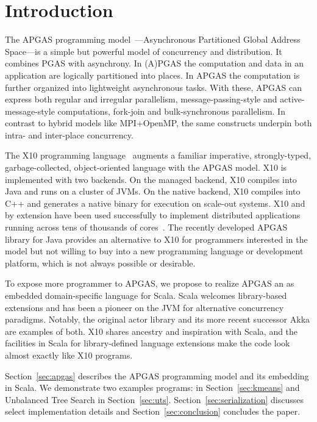 \section{Introduction}

The APGAS programming model~\cite{amp10}---Asynchronous Partitioned Global Address Space---is a simple but powerful
model of concurrency and distribution. It combines PGAS with asynchrony.
In (A)PGAS the computation and data in an application are logically partitioned into places.
In APGAS the computation is further organized into lightweight asynchronous tasks.
With these, APGAS can express both
regular and irregular parallelism, message-passing-style and
active-message-style computations, fork-join and bulk-synchronous
parallelism.  In contrast to hybrid models like MPI+OpenMP, the same
constructs underpin both intra- and inter-place concurrency.

The X10 programming language~\cite{oopsla05} augments a familiar imperative, strongly-typed, garbage-collected, object-oriented language with the APGAS model. X10 is implemented with two backends. On the managed backend, X10
compiles into Java and runs on a cluster of JVMs. On the native backend, X10 compiles into C++ and generates a native binary
for execution on scale-out systems.
X10 and by extension
\apgas have been used successfully to implement distributed applications
running across tens of thousands of cores~\cite{TardieuETAL14X10ApgasAtPetascale}.
The recently developed APGAS library for Java \cite{APGASJava} provides an alternative to X10 for programmers interested in the \apgas model but not willing to buy into a new programming language or development platform, which is not always possible or desirable.

To expose more programmer to APGAS, we propose to realize APGAS an as embedded domain-specific language for Scala. 
Scala welcomes library-based extensions and has been a pioneer on
the JVM for alternative concurrency paradigms. Notably, the original actor
library and its more recent successor Akka are examples of both. 
X10 shares ancestry and inspiration with Scala, and the
facilities in Scala for library-defined language extensions make the code look
almost exactly like X10 programs.

Section~\ref{sec:apgas} describes the APGAS programming model and its embedding in Scala. We demonstrate two examples programs: \kmeans in Section~\ref{sec:kmeans} and Unbalanced Tree Search in Section~\ref{sec:uts}. Section~\ref{sec:serialization} discusses select implementation details and Section~\ref{sec:conclusion} concludes the paper.



